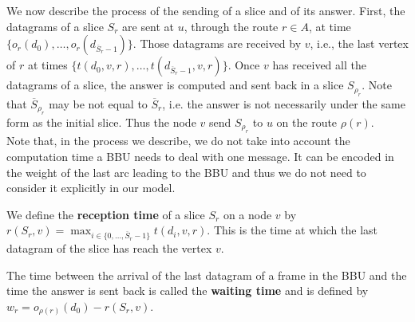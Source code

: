 \documentclass[10pt]{article}
\begin{document}
     
     We now describe the process of the sending of a slice and of its answer. First, the datagrams of a slice $S_r$ are sent at $u$, through the route $r \in A$, at time $\{o_r(d_0),\ldots,o_r(d_{\overline S_r-1}) \}$.
      Those datagrams are received by $v$, i.e., the last vertex of $r$ at times $\{t(d_0,v,r),\ldots,t(d_{\overline S_r-1},v,r)\}$. 
     Once $v$ has received all the datagrams of a slice, the answer is computed and sent back in a slice $S_{\rho_r}$. Note that $\overline S_{\rho_r}$ may be not equal to $\overline S_r$, i.e. the answer is not necessarily under the same form as the initial slice. Thus the node $v$ send $S_{\rho_r}$ to  $u$ on the route $\rho(r)$.\\
     Note that, in the process we describe, we do not take into account the computation time a BBU needs to deal with one message. It can be encoded in the weight of the last arc leading to the BBU and thus we do not need to consider it explicitly in our model. 
      
      
 
      We define the {\bf reception time} of a slice $S_r$ on a node $v$ by $r(S_r,v) =  \displaystyle \max_{i \in \{0,\ldots,\overline S_r-1\}} t(d_i,v,r)$. This is the time at which the last datagram of the slice has reach the vertex $v$.
      
      The time between the arrival of the last datagram of a frame in the BBU and the time the answer is sent back is called the \textbf{waiting time} and is defined by $w_r = o_{\rho(r)}(d_0) - r(S_r,v)$.
      
 
%      
      
\end{document}
